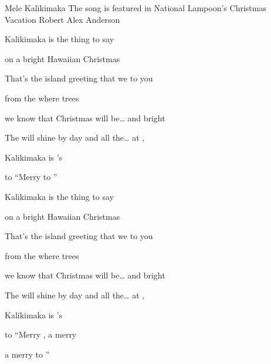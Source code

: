 \begin{SBSong}{Mele Kalikimaka}
    {The song is featured in National Lampoon's Christmas Vacation}
    {Robert Alex Anderson}
  \SBDirection{}
  \begin{SBVerse}
     Kalikimaka is the thing to say 
    
    on a bright Hawaiian Christmas 
    
    That's the island greeting that we  to you 
    
    from the  where  trees 
    
     we know that Christmas will be\ldots {} and bright 
    
    The  will shine by day and all the\ldots {} at ,
    
     Kalikimaka is 's  
    
    to  ``Merry  to '' 
  \end{SBVerse}
  \begin{SBVerse}
     Kalikimaka is the thing to say 
    
    on a bright Hawaiian Christmas 
    
    That's the island greeting that we  to you 
    
    from the  where  trees 
    
     we know that Christmas will be\ldots {} and bright 
    
    The  will shine by day and all the\ldots {} at ,
    
     Kalikimaka is 's  
    
    to  ``Merry , a  merry 
    
    a  merry  to ''  
  \end{SBVerse}
 
\end{SBSong}
    
